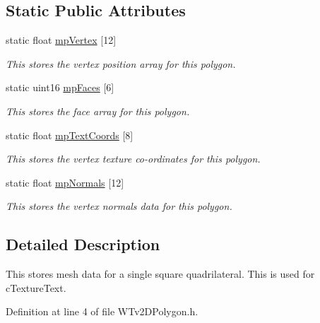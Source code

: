 \subsection*{Static Public Attributes}
\begin{DoxyCompactItemize}
\item 
static float \hyperlink{classv2_d_polygon_a8862118bbcb236dd1188f4dda9533152}{mpVertex} \mbox{[}12\mbox{]}
\begin{DoxyCompactList}\small\item\em This stores the vertex position array for this polygon. \item\end{DoxyCompactList}\item 
static uint16 \hyperlink{classv2_d_polygon_ae352b67e87126247d82c34a27aa5fd7c}{mpFaces} \mbox{[}6\mbox{]}
\begin{DoxyCompactList}\small\item\em This stores the face array for this polygon. \item\end{DoxyCompactList}\item 
static float \hyperlink{classv2_d_polygon_a80704feccc5934a85bcf5837142c865c}{mpTextCoords} \mbox{[}8\mbox{]}
\begin{DoxyCompactList}\small\item\em This stores the vertex texture co-\/ordinates for this polygon. \item\end{DoxyCompactList}\item 
static float \hyperlink{classv2_d_polygon_a79c7a17e7b0b50165282f68d644dad2e}{mpNormals} \mbox{[}12\mbox{]}
\begin{DoxyCompactList}\small\item\em This stores the vertex normals data for this polygon. \item\end{DoxyCompactList}\end{DoxyCompactItemize}


\subsection{Detailed Description}
This stores mesh data for a single square quadrilateral. This is used for cTextureText. 

Definition at line 4 of file WTv2DPolygon.h.



